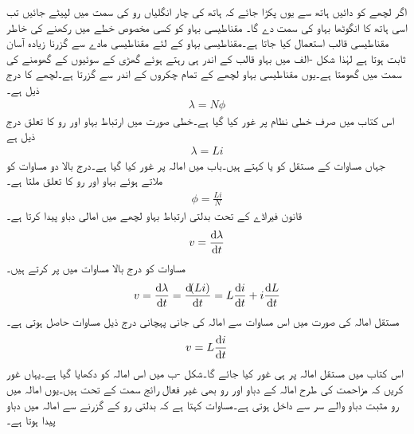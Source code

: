 اگر لچھے کو دائیں ہاتھ سے یوں پکڑا جائے کہ ہاتھ کی چار انگلیاں رو کی سمت میں لپیٹے جائیں تب اسی ہاتھ کا انگوٹھا بہاو کی سمت دے گا۔
مقناطیسی بہاو کو کسی مخصوص خطے میں رکھنے کی خاطر مقناطیسی قالب استعمال کیا جاتا ہے۔مقناطیسی بہاو کے لئے مقناطیسی مادے سے گزرنا زیادہ آسان ثابت ہوتا ہے لہٰذا شکل -الف میں بہاو قالب کے اندر ہی رہتے ہوئے گھڑی کے سوئیوں کے گھومنے  کی سمت میں گھومتا ہے۔یوں مقناطیسی بہاو  لچھے کے تمام چکروں کے اندر سے گزرتا ہے۔لچھے کا   درج ذیل ہے۔
\begin{align}\label{مساوات_مشترک_ارتباط_بہاو_الف}
\lambda=N \phi
\end{align}
اس کتاب میں صرف خطی نظام پر غور کیا گیا ہے۔خطی صورت میں ارتباط بہاو اور رو کا تعلق درج ذیل ہے
\begin{align}\label{مساوات_مشترک_ارتباط_بہاو_ب}
\lambda=L i
\end{align}
جہاں مساوات کے مستقل  کو  یا  کہتے ہیں۔باب  میں امالہ پر غور کیا گیا ہے۔درج بالا دو مساوات کو ملاتے ہوئے  بہاو اور رو کا تعلق ملتا ہے۔
\begin{align}
\phi=\frac{Li}{N}
\end{align}
قانون فیراڈے کے تحت بدلتی ارتباط بہاو لچھے میں امالی دباو پیدا کرتا ہے۔
\begin{align}
v=\frac{\dif \lambda}{\dif t}
\end{align}
مساوات  کو درج بالا مساوات میں پر کرتے ہیں۔
\begin{align*}
v=\frac{\dif \lambda}{\dif t}=\frac{\dif (Li)}{\dif t}=L\frac{\dif i}{\dif t}+i\frac{\dif L}{\dif t}
\end{align*}
مستقل امالہ کی صورت میں اس مساوات سے امالہ کی جانی پہچانی درج ذیل مساوات حاصل ہوتی ہے۔
\begin{align}\label{مساوات_مقناطیسی_امالہ_کی_مساوات}
v=L\frac{\dif i}{\dif t}
\end{align}
اس کتاب میں مستقل امالہ پر ہی غور کیا جائے گا۔شکل -ب میں اس امالہ کو دکھایا گیا ہے۔یہاں غور کریں کہ مزاحمت کی طرح امالہ کے دباو اور رو بھی غیر فعال رائج سمت کے تحت ہیں۔یوں امالہ میں رو مثبت دباو والے سر سے داخل ہوتی ہے۔مساوات  کہتا ہے کہ  بدلتی رو کے گزرنے سے امالہ میں دباو پیدا ہوتا ہے۔
%
